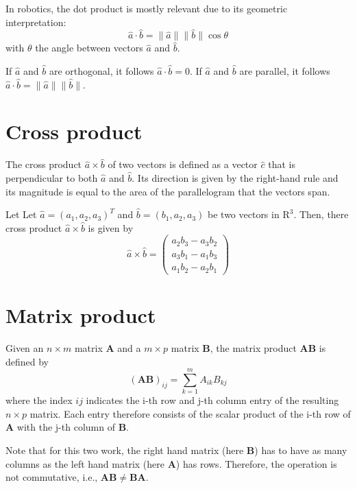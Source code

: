 \documentclass[paper=6.14in:9.21in,pagesize=pdftex,11pt,twoside,openright]{scrbook}
\begin{document}
In robotics, the dot product is mostly relevant due to its geometric interpretation:
\begin{equation}
\hat{a}\cdot\hat{b}=\|\hat{a}\|\|\hat{b}\|\cos\theta
\end{equation}
with $\theta$ the angle between vectors $\hat{a}$ and $\hat{b}$.

If $\hat{a}$ and $\hat{b}$ are orthogonal, it follows $\hat{a}\cdot\hat{b}=0$. If $\hat{a}$ and $\hat{b}$ are parallel, it follows $\hat{a}\cdot\hat{b}=\|\hat{a}\|\|\hat{b}\|$.

\section{Cross product}
The cross product $\hat{a} \times \hat{b}$ of two vectors is defined as a vector $\hat{c}$ that is perpendicular to both $\hat{a}$ and $\hat{b}$. Its direction is given by the right-hand rule and its magnitude is equal to the area of the parallelogram that the vectors span.

Let Let $\hat{a}=(a_1,a_2,a_3)^T$ and $\hat{b}=(b_1,a_2,a_3)$ be two vectors in $\mathrm{R}^3$. Then, there cross product $\hat{a}\times\hat{b}$ is given by
\begin{equation}
\hat{a}\times\hat{b}=\left(
\begin{array}{l}
a_2b_3-a_3b_2\\
a_3b_1-a_1b_3\\
a_1b_2-a_2b_1
\end{array}
\right)
\end{equation}


\section{Matrix product}
Given an $n \times m$ matrix $\mathbf{A}$ and a $m\times p$ matrix $\mathbf{B}$, the matrix product $\mathbf{AB}$ is defined by
\begin{equation}
(\mathbf{AB})_{ij}=\sum_{k=1}^mA_{ik}B_{kj}
\end{equation}
where the index $ij$ indicates the i-th row and j-th column entry of the resulting $n\times p $ matrix. Each entry therefore consists of the scalar product of the i-th row of $\mathbf{A}$ with the j-th column of $\mathbf{B}$.

Note that for this two work, the right hand matrix (here $\mathbf{B}$) has to have as many columns as the left hand matrix (here $\mathbf{A}$) has rows. Therefore, the operation is not commutative, i.e., $\mathbf{AB}\neq\mathbf{BA}$.
\end{document}
